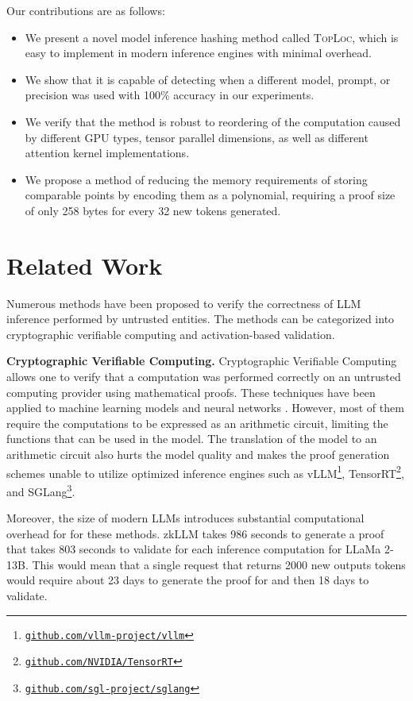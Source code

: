 \documentclass{article}
\theoremstyle{plain}
\theoremstyle{definition}
\theoremstyle{remark}
\newcommand{\toploc}{\textsc{TopLoc}}
\begin{document}
Our contributions are as follows:
\begin{itemize}
    \item We present a novel model inference hashing method called \toploc, which is easy to implement in modern inference engines with minimal overhead.
    \item We show that it is capable of detecting when a different model, prompt, or precision was used with 100\% accuracy in our experiments.
    \item We verify that the method is robust to reordering of the computation caused by different GPU types, tensor parallel dimensions, as well as different attention kernel implementations.
    \item We propose a method of reducing the memory requirements of storing comparable points by encoding them as a polynomial, requiring a proof size of only 258 bytes for every 32 new tokens generated.
\end{itemize}

\section{Related Work}

Numerous methods have been proposed to verify the correctness of LLM inference performed by untrusted entities.
The methods can be categorized into cryptographic verifiable computing and activation-based validation.

\textbf{Cryptographic Verifiable Computing.}
Cryptographic Verifiable Computing allows one to verify that a computation was performed correctly on an untrusted computing provider using mathematical proofs. 
These techniques have been applied to machine learning models and neural networks \citep{zkllm, firstZKML, zkDL, zkDNN, safetynets}.
However, most of them require the computations to be expressed as an arithmetic circuit, limiting the functions that can be used in the model.
The translation of the model to an arithmetic circuit also hurts the model quality and makes the proof generation schemes unable to utilize optimized inference engines such as vLLM\footnote{\href{https://github.com/vllm-project/vllm}{\texttt{github.com/vllm-project/vllm}}}, TensorRT\footnote{\href{https://github.com/NVIDIA/TensorRT}{\texttt{github.com/NVIDIA/TensorRT}}}, and SGLang\footnote{\href{https://github.com/sgl-project/sglang}{\texttt{github.com/sgl-project/sglang}}}.

Moreover, the size of modern LLMs introduces substantial computational overhead for for these methods.
zkLLM \citep{zkllm} takes 986 seconds to generate a proof that takes 803 seconds to validate for each inference computation for LLaMa 2-13B.
This would mean that a single request that returns 2000 new outputs tokens would require about 23 days to generate the proof for and then 18 days to validate.
\end{document}
